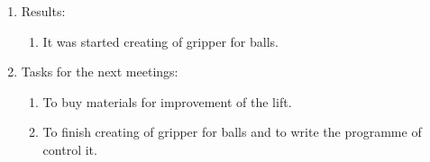 \begin{enumerate}
\begin{enumerate}
    \end{enumerate}
    
	\item Results: 
	\begin{enumerate}
	  \item It was started creating of gripper for balls.
      
    \end{enumerate}
    
	\item Tasks for the next meetings:
	\begin{enumerate}
	  \item To buy materials for improvement of the lift.
	  
	  \item To finish creating of gripper for balls and to write the programme of control it.

    \end{enumerate}     
\end{enumerate}
\fillpage
